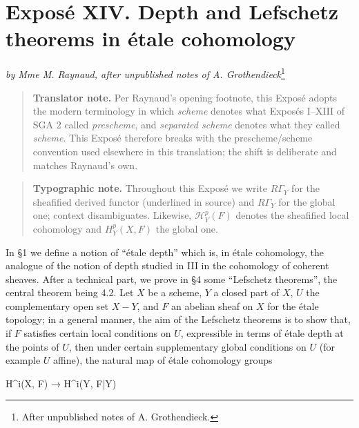 \documentclass[
  11pt,
  a4paper,
]{book}
\newenvironment{Shaded}{}{}
\newcommand{\NormalTok}[1]{#1}
\begin{document}
\chapter{Exposé XIV. Depth and Lefschetz theorems in étale
cohomology}\label{exposuxe9-xiv.-depth-and-lefschetz-theorems-in-uxe9tale-cohomology}

\emph{by Mme M. Raynaud, after unpublished notes of A.
Grothendieck}\footnote{After unpublished notes of A. Grothendieck.}

\begin{quote}
\textbf{Translator note.} Per Raynaud's opening footnote, this Exposé
adopts the modern terminology in which \emph{scheme} denotes what
Exposés I--XIII of SGA 2 called \emph{prescheme}, and \emph{separated
scheme} denotes what they called \emph{scheme}. This Exposé therefore
breaks with the prescheme/scheme convention used elsewhere in this
translation; the shift is deliberate and matches Raynaud's own.
\end{quote}

\begin{quote}
\textbf{Typographic note.} Throughout this Exposé we write
\(R\Gamma_{Y}\) for the sheafified derived functor (underlined in
source) and \(R\Gamma_{Y}\) for the global one; context disambiguates.
Likewise, \(\mathcal{H}^{p}_{Y}(F)\) denotes the sheafified local
cohomology and \(H^{p}_{Y}(X, F)\) the global one.
\end{quote}

In §1 we define a notion of ``étale depth'' which is, in étale
cohomology, the analogue of the notion of depth studied in III in the
cohomology of coherent sheaves. After a technical part, we prove in §4
some ``Lefschetz theorems'', the central theorem being 4.2. Let \(X\) be
a scheme, \(Y\) a closed part of \(X\), \(U\) the complementary open set
\(X - Y\), and \(F\) an abelian sheaf on \(X\) for the étale topology;
in a general manner, the aim of the Lefschetz theorems is to show that,
if \(F\) satisfies certain local conditions on \(U\), expressible in
terms of étale depth at the points of \(U\), then under certain
supplementary global conditions on \(U\) (for example \(U\) affine), the
natural map of étale cohomology groups

\begin{Shaded}
\begin{Highlighting}[]
\NormalTok{H\^{}i(X, F) → H\^{}i(Y, F|Y)}
\end{Highlighting}
\end{Shaded}
\end{document}
